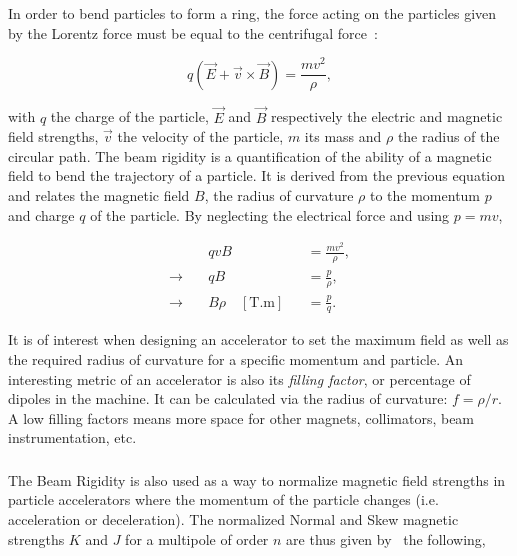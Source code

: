 In order to bend particles to form a ring, the force acting on the particles given by the Lorentz
force must be equal to the centrifugal force~\cite{holzer_design_2020,wiedemann_particle_2015}:

\begin{equation}
    q(\vec{E} + \vec{v} \times \vec{B}) = \frac{mv^2}{\rho},
\end{equation}

with $q$ the charge of the particle, $\vec{E}$ and $\vec{B}$ respectively the electric and magnetic
field strengths, $\vec{v}$ the velocity of the particle, $m$ its mass and $\rho$ the radius of the
circular path. 
The beam rigidity is a quantification of the ability of a magnetic field to bend the trajectory of a
particle. It is derived from the previous equation and relates the
magnetic field $B$, the radius of curvature $\rho$ to the momentum $p$ and charge $q$ of the
particle. By neglecting the electrical force and using $p = mv$,

\begin{equation}
    \begin{aligned}
                           & qvB &&= \frac{mv^2}{\rho}, \\
        \rightarrow  \quad & qB &&= \frac{p}{\rho}, \\
        \rightarrow  \quad & B\rho \quad [\textrm{T.m}] &&= \frac{p}{q}.
    \end{aligned}
    \label{eq:magnetic_fields_beam_rigidity}
\end{equation}

It is of interest when designing an accelerator to set the maximum field as well as the required
radius of curvature for a specific momentum and particle.
An interesting metric of an accelerator is also its \textit{filling factor}, or percentage of
dipoles in the machine. It can be calculated via the radius of curvature: $f = \rho / r$. A low 
filling factors means more space for other magnets, collimators, beam instrumentation, etc.

\subsubsection{}

The Beam Rigidity is also used as a way to normalize magnetic field strengths in particle
accelerators where the momentum of the particle changes (i.e. acceleration or deceleration).
The normalized Normal and Skew magnetic strengths $K$ and $J$ for a multipole of order $n$ are thus
given by~\cite{wolf_engineering_2001} the following,

